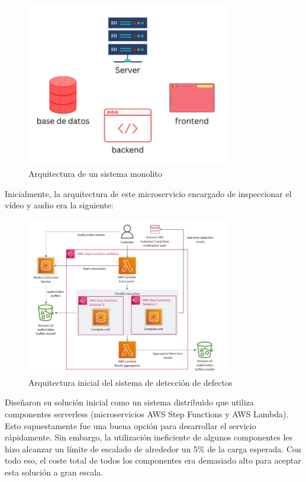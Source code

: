 \documentclass[12pt,a4paper]{article}
\begin{document}
    \begin{figure}[H]
        \centering
        \includegraphics[width=0.8\textwidth]{./img/monolito_amazon.png}
        \caption{Arquitectura de un sistema monolito}
        \label{fig:amazon_monolito}
    \end{figure}

    Inicialmente, la arquitectura de este microservicio encargado de inspeccionar el vídeo y audio era la siguiente:

    \begin{figure}[H]
        \centering
        \includegraphics[width=0.8\textwidth]{./img/deteccion_defectos_amazon.png}
        \caption{Arquitectura inicial del sistema de detección de defectos}
        \label{fig:amazon_deteccion_fallos}
    \end{figure}

    Diseñaron su solución inicial como un sistema distribuido que utiliza componentes serverless (microservicios AWS Step Functions y AWS Lambda). Esto supuestamente fue una buena opción para desarrollar el servicio rápidamente. Sin embargo, la utilización ineficiente de algunos componentes les hizo alcanzar un límite de escalado de alrededor un 5\% de la carga esperada. Con todo eso, el coste total de todos los componentes era demasiado alto para aceptar esta solución a gran escala.
\end{document}
